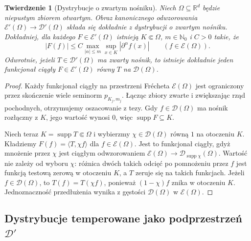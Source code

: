 \documentclass[11pt,a4paper]{article}
\numberwithin{equation}{section}
\theoremstyle{plain}
\newtheorem{twierdzenie}{Twierdzenie}[section]
\theoremstyle{definition}
\theoremstyle{remark}
\newcommand{\R}{\mathbb R}
\newcommand{\N}{\mathbb N}
\DeclareMathOperator{\supp}{supp}
\begin{document}
\begin{twierdzenie}[Dystrybucje o zwartym nośniku]
\label{thm:compact-support-E25}
Niech $\Omega\subseteq\R^d$ będzie niepustym zbiorem otwartym.
Obraz kanonicznego odwzorowania
$\mathcal E'(\Omega)\to\mathcal D'(\Omega)$
składa się dokładnie z dystrybucji o zwartym nośniku.
Dokładniej, dla każdego $F\in\mathcal E'(\Omega)$ istnieją
$K\Subset\Omega$, $m\in\N_0$ i $C>0$ takie, że
\[
 |F(f)|\le C\max_{|\alpha|\le m}\sup_{x\in K}
 |\partial^\alpha f(x)|\qquad(f\in\mathcal E(\Omega)).
\]
Odwrotnie, jeżeli $T\in\mathcal D'(\Omega)$ ma zwarty nośnik,
to istnieje dokładnie jeden funkcjonał ciągły
$F\in\mathcal E'(\Omega)$ równy $T$ na $\mathcal D(\Omega)$.
\end{twierdzenie}
\begin{proof}
Każdy funkcjonał ciągły na przestrzeni Frécheta
$\mathcal E(\Omega)$ jest ograniczony przez skończenie wiele
seminorm $p_{K_j,m_j}$. Łącząc zbiory zwarte i zwiększając
rząd pochodnych, otrzymujemy oszacowanie z tezy. Gdy
$f\in\mathcal D(\Omega)$ ma nośnik rozłączny z $K$, jego
wartość wynosi $0$, więc $\supp F\subseteq K$.

Niech teraz $K=\supp T\Subset\Omega$ i wybierzmy
$\chi\in\mathcal D(\Omega)$ równą $1$ na otoczeniu $K$.
Kładziemy $F(f)=\langle T,\chi f\rangle$ dla
$f\in\mathcal E(\Omega)$. Jest to funkcjonał ciągły,
gdyż mnożenie przez $\chi$ jest ciągłym odwzorowaniem
$\mathcal E(\Omega)\to\mathcal D_{\supp\chi}(\Omega)$.
Wartość nie zależy od wyboru $\chi$: różnica dwóch takich
odcięć po pomnożeniu przez $f$ jest funkcją testową
zerową w otoczeniu $K$, a $T$ zeruje się na takich
funkcjach. Jeżeli $f\in\mathcal D(\Omega)$, to
$T(f)=T(\chi f)$, ponieważ $(1-\chi)f$ znika w
otoczeniu $K$. Jednoznaczność przedłużenia wynika
z gęstości $\mathcal D(\Omega)$ w $\mathcal E(\Omega)$.
\end{proof}

\subsection{Dystrybucje temperowane jako podprzestrzeń \texorpdfstring{$\mathcal D'$}{D'}}
\end{document}
